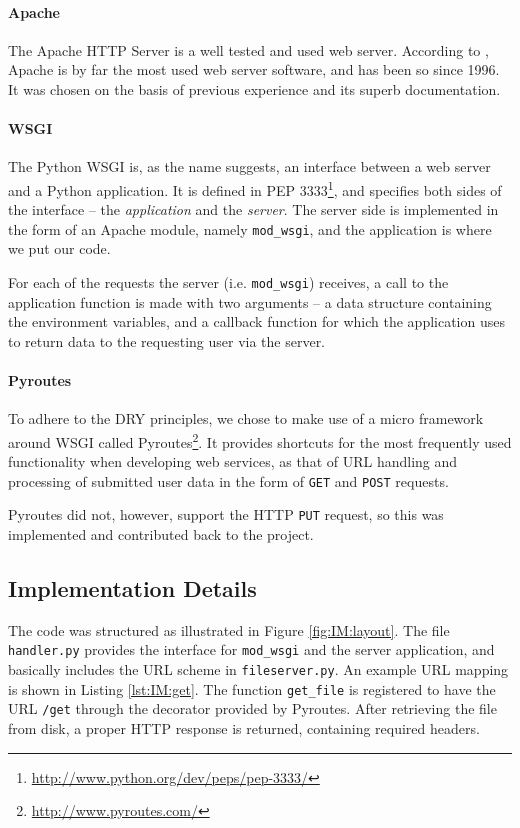 \documentclass[pdftex,english,10pt,b5paper,twoside]{book}
\begin{document}
\paragraph{Apache} The Apache HTTP Server is a well tested and used web
server. According to \citet{netcraft}, Apache is by far the most used web server
software, and has been so since 1996. It was chosen on the basis of previous
experience and its superb documentation.

\paragraph{\acs{WSGI}} The Python \ac{WSGI} is, as the name suggests, an
interface between a web server and a Python application. It is defined in
\ac{PEP} 3333\footnote{\url{http://www.python.org/dev/peps/pep-3333/}}, and
specifies both sides of the interface -- the \emph{application} and the
\emph{server}. The server side is implemented in the form of an Apache
module, namely \texttt{mod\_wsgi}, and the application is where we put our
code.

For each of the requests the server (i.e. \texttt{mod\_wsgi}) receives, a call
to the application function is made with two arguments -- a data structure
containing the environment variables, and a callback function for which the
application uses to return data to the requesting user via the server.

\paragraph{Pyroutes} To adhere to the \ac{DRY} principles, we chose to make use
of a micro framework around \ac{WSGI} called
Pyroutes\footnote{\url{http://www.pyroutes.com/}}. It provides shortcuts for the
most frequently used functionality when developing web services, as that of
\ac{URL} handling and processing of submitted user data in the form of
\texttt{GET} and \texttt{POST} requests.

Pyroutes did not, however, support the HTTP \texttt{PUT} request, so this was
implemented and contributed back to the project.

\subsection{Implementation Details}

The code was structured as illustrated in Figure \ref{fig:IM:layout}. The file
\texttt{handler.py} provides the interface for \texttt{mod\_wsgi} and the server
application, and basically includes the \ac{URL} scheme in
\texttt{fileserver.py}. An example \ac{URL} mapping is shown in Listing
\ref{lst:IM:get}. The function \texttt{get\_file} is registered to have the
\ac{URL} \texttt{/get} through the decorator provided by Pyroutes. After
retrieving the file from disk, a proper \ac{HTTP} response is returned,
containing required headers.
\end{document}
